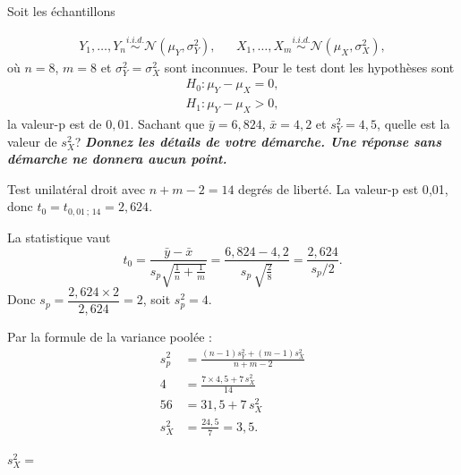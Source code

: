 \begin{questions}

\pageblanche
\question[10]
Soit les échantillons

\begin{align*}
Y_{1}, \ldots, Y_{n} \overset{i.i.d.}{\sim} \mathcal{N}(\mu_Y, \sigma^2_Y), & & X_{1}, \ldots, X_{m} \overset{i.i.d.}{\sim} \mathcal{N}(\mu_X, \sigma^2_X),
\end{align*}
où $n=8$, $m=8$ et $\sigma^2_Y=\sigma^2_X$ sont inconnues. Pour le test dont les hypothèses sont 
\begin{align*}
    H_0: \mu_Y-\mu_X=0,\\
    H_1: \mu_Y-\mu_X>0,
\end{align*}
 la valeur-p est de $0,01$. Sachant que $\bar{y}=6,824$, $\bar{x}=4,2$ et $s^2_Y=4,5$, quelle est la valeur de $s^2_X$? \textbf{\textit{Donnez les détails de votre démarche. Une réponse sans démarche ne donnera aucun point.}}
\begin{solution}
Test unilatéral droit avec $n+m-2=14$ degrés de liberté. La valeur-p est 0{,}01, donc $t_0 = t_{0{,}01\,;\,14} = 2{,}624$.

La statistique vaut
\[
t_0 = \frac{\bar{y}-\bar{x}}{s_p\sqrt{\frac{1}{n}+\frac{1}{m}}} = \frac{6{,}824-4{,}2}{s_p\,\sqrt{\frac{2}{8}}} = \frac{2{,}624}{s_p / 2}.
\]
Donc $s_p = \dfrac{2{,}624 \times 2}{2{,}624} = 2$, soit $s_p^2 = 4$.

Par la formule de la variance poolée :
\begin{align*}
s_p^2 &= \frac{(n-1)s_Y^2 + (m-1)s_X^2}{n+m-2} \\
4 &= \frac{7\times 4{,}5 + 7\,s_X^2}{14} \\
56 &= 31{,}5 + 7\,s_X^2 \\
s_X^2 &= \frac{24{,}5}{7} = 3{,}5.
\end{align*}
\end{solution}
\vspace{18cm}
$s^2_X=$ 


\end{questions}
